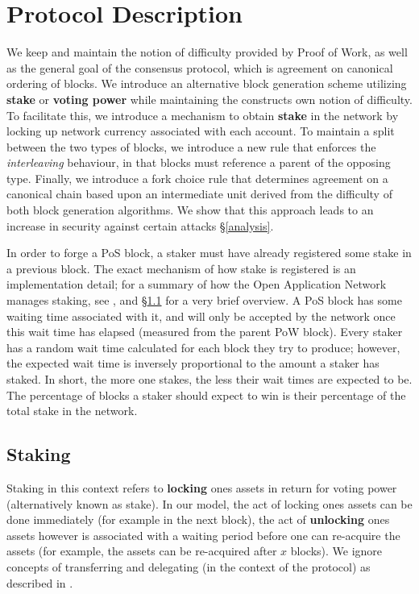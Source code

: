 \section{Protocol Description}
\label{unity}


We keep and maintain the notion of difficulty provided by Proof of Work, as well as the general goal of the consensus protocol, which is agreement on canonical ordering of blocks. We introduce an alternative block generation scheme utilizing \textbf{stake} or \textbf{voting power} while maintaining the constructs own notion of difficulty. To facilitate this, we introduce a mechanism to obtain \textbf{stake} in the network by locking up network currency associated with each account. To maintain a split between the two types of blocks, we introduce a new rule that enforces the \textit{interleaving} behaviour, in that blocks must reference a parent of the opposing type. Finally, we introduce a fork choice rule that determines agreement on a canonical chain based upon an intermediate unit derived from the difficulty of both block generation algorithms. We show that this approach leads to an increase in security against certain attacks \S\ref{analysis}.

In order to forge a PoS block, a staker must have already registered some stake in a previous block. The exact mechanism of how stake is registered is an implementation detail; for a summary of how the Open Application Network manages staking, see \cite{unity_design_spec}, and \S\ref{staking_mechanism} for a very brief overview. A PoS block has some waiting time associated with it, and will only be accepted by the network once this wait time has elapsed (measured from the parent PoW block). Every staker has a random wait time calculated for each block they try to produce; however, the expected wait time is inversely proportional to the amount a staker has staked. In short, the more one stakes, the less their wait times are expected to be. The percentage of blocks a staker should expect to win is their percentage of the total stake in the network.

\subsection{Staking}
\label{staking_mechanism}

Staking in this context refers to \textbf{locking} ones assets in return for voting power (alternatively known as stake). In our model, the act of locking ones assets can be done immediately (for example in the next block), the act of \textbf{unlocking} ones assets however is associated with a waiting period before one can re-acquire the assets (for example, the assets can be re-acquired after $x$ blocks). We ignore concepts of transferring and delegating (in the context of the protocol) as described in \cite{unity_design_spec}.

